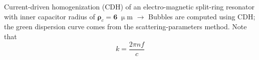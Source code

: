 \documentclass[t]{beamer} \usepackage[english]{babel} \usepackage[utf8]{inputenc} \usetheme{Frankfurt} %
\begin{document}

\begin{frame}[plain]{}%
\begin{columns}[T] %
	\begin{column}{.55\textwidth}
	\vspace{3mm}
	\noindent Current-driven homogenization (CDH) of an electro-magnetic split-ring resonator with inner capacitor radius of $\pmb\rho_c=\pmb 6\;\upmu$m $\rightarrow$
	\vspace{3mm}
	\noindent Bubbles are computed using CDH; the green dispersion curve comes from the scattering-parameters method. Note that $$k = \frac{2\pi n f}{c}$$
	\vspace{5mm}


\end{column}
\end{columns}
\end{frame}
\end{document}
